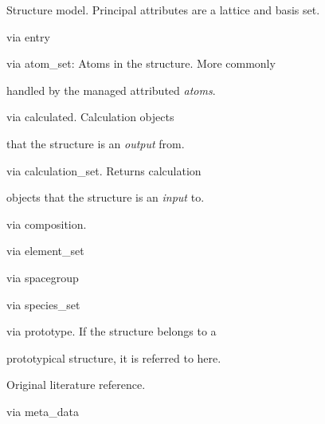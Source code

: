 \documentclass[letterpaper,10pt,english]{sphinxmanual}
\begin{document}
\begin{fulllineitems}
\label{models:qmpy.Structure}
Structure model. Principal attributes are a lattice and basis set.
\begin{description}
\item[{Relationships:}] \leavevmode
\begin{DUlineblock}{0em}
\item[] {\hyperref[models:qmpy.Entry]{}} via entry
\item[] {\hyperref[models:qmpy.Atom]{}} via atom\_set: Atoms in the structure. More commonly
\item[]
\begin{DUlineblock}{\DUlineblockindent}
\item[] handled by the managed attributed \emph{atoms}.
\end{DUlineblock}
\item[] {\hyperref[models:qmpy.Calculation]{}} via calculated. Calculation objects
\item[]
\begin{DUlineblock}{\DUlineblockindent}
\item[] that the structure is an \emph{output} from.
\end{DUlineblock}
\item[] {\hyperref[models:qmpy.Calculation]{}} via calculation\_set. Returns calculation
\item[]
\begin{DUlineblock}{\DUlineblockindent}
\item[] objects that the structure is an \emph{input} to.
\end{DUlineblock}
\item[] {\hyperref[models:qmpy.Composition]{}} via composition.
\item[] {\hyperref[models:qmpy.Element]{}} via element\_set
\item[] {\hyperref[models:qmpy.Spacegroup]{}} via spacegroup
\item[] {\hyperref[models:qmpy.Species]{}} via species\_set
\item[] {\hyperref[models:qmpy.Prototype]{}} via prototype. If the structure belongs to a
\item[]
\begin{DUlineblock}{\DUlineblockindent}
\item[] prototypical structure, it is referred to here.
\end{DUlineblock}
\item[] {\hyperref[models:qmpy.Reference]{}} Original literature reference.
\item[] {\hyperref[models:qmpy.MetaData]{}} via meta\_data
\end{DUlineblock}


\end{description}
\end{fulllineitems}
\end{document}
